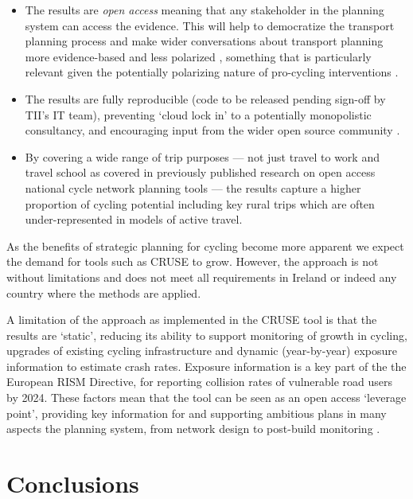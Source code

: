 \documentclass[
  super,
  preprint,
  3p]{elsarticle}
\providecommand{\tightlist}{%
  \setlength{\itemsep}{0pt}\setlength{\parskip}{0pt}}\usepackage{longtable,booktabs,array}
\begin{document}
\begin{itemize}
\tightlist
\item
  The results are \emph{open access} meaning that any stakeholder in the
  planning system can access the evidence. This will help to democratize
  the transport planning process and make wider conversations about
  transport planning more evidence-based and less polarized
  \citep{lovelace2020}, something that is particularly relevant given
  the potentially polarizing nature of pro-cycling interventions
  \citep{wild2017}.
\item
  The results are fully reproducible (code to be released pending
  sign-off by TII's IT team), preventing `cloud lock in' to a
  potentially monopolistic consultancy, and encouraging input from the
  wider open source community \citep{lovelace2021, dhir2017}.
\item
  By covering a wide range of trip purposes --- not just travel to work
  \citep{lovelace2017, heinen2010} and travel school \citep{goodman2019}
  as covered in previously published research on open access national
  cycle network planning tools --- the results capture a higher
  proportion of cycling potential including key rural trips which are
  often under-represented in models of active travel.
\end{itemize}

As the benefits of strategic planning for cycling become more apparent
\citep{scappini2022} we expect the demand for tools such as CRUSE to
grow. However, the approach is not without limitations and does not meet
all requirements in Ireland or indeed any country where the methods are
applied.

A limitation of the approach as implemented in the CRUSE tool is that
the results are `static', reducing its ability to support monitoring of
growth in cycling, upgrades of existing cycling infrastructure and
dynamic (year-by-year) exposure information to estimate crash rates.
Exposure information is a key part of the the European RISM Directive,
for reporting collision rates of vulnerable road users by 2024. These
factors mean that the tool can be seen as an open access `leverage
point', providing key information for and supporting ambitious plans in
many aspects the planning system, from network design to post-build
monitoring \citep{lovelace2020}.

\section{Conclusions}\label{sec-conclusions}
\end{document}
